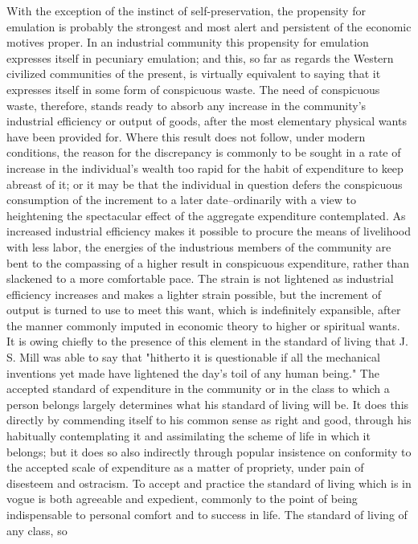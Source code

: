 \documentclass[12pt]{report}
\begin{document}
With the exception of the instinct of self-preservation, the propensity
for emulation is probably the strongest and most alert and persistent of
the economic motives proper. In an industrial community this propensity
for emulation expresses itself in pecuniary emulation; and this, so
far as regards the Western civilized communities of the present, is
virtually equivalent to saying that it expresses itself in some form
of conspicuous waste. The need of conspicuous waste, therefore, stands
ready to absorb any increase in the community's industrial efficiency
or output of goods, after the most elementary physical wants have
been provided for. Where this result does not follow, under modern
conditions, the reason for the discrepancy is commonly to be sought in
a rate of increase in the individual's wealth too rapid for the habit of
expenditure to keep abreast of it; or it may be that the individual in
question defers the conspicuous consumption of the increment to a later
date--ordinarily with a view to heightening the spectacular effect
of the aggregate expenditure contemplated. As increased industrial
efficiency makes it possible to procure the means of livelihood with
less labor, the energies of the industrious members of the community are
bent to the compassing of a higher result in conspicuous expenditure,
rather than slackened to a more comfortable pace. The strain is not
lightened as industrial efficiency increases and makes a lighter strain
possible, but the increment of output is turned to use to meet this
want, which is indefinitely expansible, after the manner commonly
imputed in economic theory to higher or spiritual wants. It is owing
chiefly to the presence of this element in the standard of living that
J. S. Mill was able to say that "hitherto it is questionable if all
the mechanical inventions yet made have lightened the day's toil of any
human being." The accepted standard of expenditure in the community
or in the class to which a person belongs largely determines what his
standard of living will be. It does this directly by commending
itself to his common sense as right and good, through his habitually
contemplating it and assimilating the scheme of life in which it
belongs; but it does so also indirectly through popular insistence
on conformity to the accepted scale of expenditure as a matter of
propriety, under pain of disesteem and ostracism. To accept and
practice the standard of living which is in vogue is both agreeable
and expedient, commonly to the point of being indispensable to personal
comfort and to success in life. The standard of living of any class, so
\end{document}
